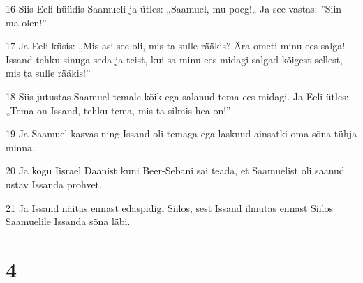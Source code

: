 \par 16 Siis Eeli hüüdis Saamueli ja ütles: „Saamuel, mu poeg!„ Ja see vastas: ”Siin ma olen!”
\par 17 Ja Eeli küsis: „Mis asi see oli, mis ta sulle rääkis? Ära ometi minu ees salga! Issand tehku sinuga seda ja teist, kui sa minu ees midagi salgad kõigest sellest, mis ta sulle rääkis!”
\par 18 Siis jutustas Saamuel temale kõik ega salanud tema ees midagi. Ja Eeli ütles: „Tema on Issand, tehku tema, mis ta silmis hea on!”
\par 19 Ja Saamuel kasvas ning Issand oli temaga ega lasknud ainsatki oma sõna tühja minna.
\par 20 Ja kogu Iisrael Daanist kuni Beer-Sebani sai teada, et Saamuelist oli saanud ustav Issanda prohvet.
\par 21 Ja Issand näitas ennast edaspidigi Siilos, sest Issand ilmutas ennast Siilos Saamuelile Issanda sõna läbi.

\chapter{4}

